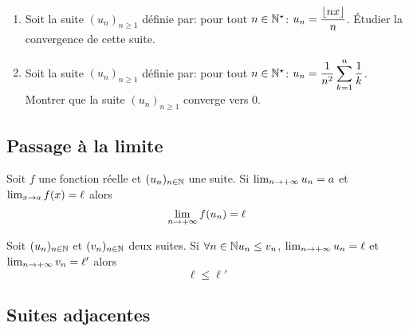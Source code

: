 \documentclass[a4paper, 11pt]{article}
\begin{document}
{\footnotesize 
\begin{exercice} 
\begin{enumerate}
\item Soit la suite $(u_n)_{n\geq 1}$ d\'efinie par: pour tout $n\in\mathbb{N}^{\star}$: $u_n=\displaystyle\frac{\lfloor nx \rfloor}{n}$. \'Etudier la convergence de cette suite.
\item Soit la suite $(u_n)_{n\geq 1}$ d\'efinie par: pour tout $n\in\mathbb{N}^{\star}$: $u_n=\displaystyle\frac{1}{n^2}\sum\limits_{k=1}^n \displaystyle\frac{1}{k}$. Montrer que la suite $(u_n)_{n\geq 1}$ converge vers 0.
\end{enumerate}
\end{exercice}}

\vspace{0.4cm}
\subsection{Passage à la limite}
\begin{theorem}
    Soit $f$ une fonction réelle et $(u_n)_{n\in \mathbb{N}}$ une suite. 
    Si $\lim_{n\rightarrow +\infty} u_n = a$  et  $\lim_{x\rightarrow a} f(x) = \ell$ alors
    $$\lim_{n\rightarrow +\infty} f(u_n) = \ell$$
    \end{theorem}


\begin{theorem}
    Soit $(u_n)_{n\in \mathbb{N}}$ et $(v_n)_{n\in \mathbb{N}}$ deux suites.  
    Si $\forall n \in \mathbb{N} u_n\leq v_n$, 
    $\lim_{n\rightarrow +\infty} u_n = \ell $ et  $\lim_{n\rightarrow +\infty} v_n = \ell' $ alors 
    $$\ell \leq \ell' $$
    \end{theorem}




\subsection{Suites adjacentes}
\end{document}
